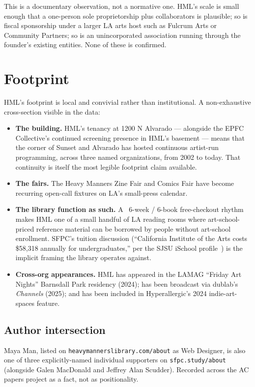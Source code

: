 \documentclass[10pt,letterpaper,twocolumn]{article}
\begin{document}
This is a documentary observation, not a normative one. HML's scale is small enough that a one-person sole proprietorship plus collaborators is plausible; so is fiscal sponsorship under a larger LA arts host such as Fulcrum Arts or Community Partners; so is an unincorporated association running through the founder's existing entities. None of these is confirmed.

\section{Footprint}

HML's footprint is local and convivial rather than institutional. A non-exhaustive cross-section visible in the data:

\begin{itemize}
\item \textbf{The building.} HML's tenancy at 1200 N Alvarado --- alongside the EPFC Collective's continued screening presence in HML's basement --- means that the corner of Sunset and Alvarado has hosted continuous artist-run programming, across three named organizations, from 2002 to today. That continuity is itself the most legible footprint claim available.
\item \textbf{The fairs.} The Heavy Manners Zine Fair and Comics Fair have become recurring open-call fixtures on LA's small-press calendar.
\item \textbf{The library function as such.} A ~6-week / 6-book free-checkout rhythm makes HML one of a small handful of LA reading rooms where art-school-priced reference material can be borrowed by people without art-school enrollment. SFPC's tuition discussion (``California Institute of the Arts costs \$58,318 annually for undergraduates,'' per the SJSU iSchool profile~\citep{sjsuischool}) is the implicit framing the library operates against.
\item \textbf{Cross-org appearances.} HML has appeared in the LAMAG ``Friday Art Nights'' Barnsdall Park residency (2024); has been broadcast via dublab's \emph{Channels} (2025); and has been included in Hyperallergic's 2024 indie-art-spaces feature.
\end{itemize}

\subsection{Author intersection}

Maya Man, listed on \texttt{heavymannerslibrary.com/about} as Web Designer, is also one of three explicitly-named individual supporters on \texttt{sfpc.study/about} (alongside Galen MacDonald and Jeffrey Alan Scudder). Recorded across the AC papers project as a fact, not as positionality.
\end{document}
